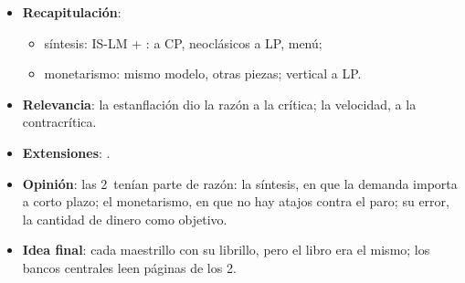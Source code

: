 \documentclass{article}
\begin{document}
\begin{columnas}
\begin{itemize}
\item \textbf{Recapitulación}:
  \begin{itemize}
  \item síntesis: IS-LM + :  a CP, neoclásicos a LP, menú;
  \item monetarismo: mismo modelo, otras piezas;  vertical a LP.
  \end{itemize}
\item \textbf{Relevancia}: la estanflación dio la razón a la crítica; la velocidad, a la contracrítica.
\item \textbf{Extensiones}:     .
\item \textbf{Opinión}: las 2~tenían parte de razón: la síntesis, en que la demanda importa a corto plazo; el monetarismo, en que no hay atajos contra el paro; su error, la cantidad de dinero como objetivo.
\item \textbf{Idea final}: cada maestrillo con su librillo, pero el libro era el mismo; los bancos centrales leen páginas de los 2.
\end{itemize}


\end{columnas}
\end{document}
